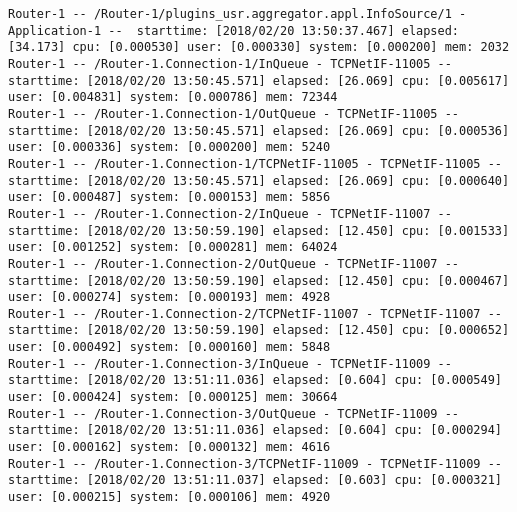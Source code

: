 \begin{lstlisting}[language=config]
Router-1 -- /Router-1/plugins_usr.aggregator.appl.InfoSource/1 - Application-1 --  starttime: [2018/02/20 13:50:37.467] elapsed: [34.173] cpu: [0.000530] user: [0.000330] system: [0.000200] mem: 2032
Router-1 -- /Router-1.Connection-1/InQueue - TCPNetIF-11005 --  starttime: [2018/02/20 13:50:45.571] elapsed: [26.069] cpu: [0.005617] user: [0.004831] system: [0.000786] mem: 72344
Router-1 -- /Router-1.Connection-1/OutQueue - TCPNetIF-11005 --  starttime: [2018/02/20 13:50:45.571] elapsed: [26.069] cpu: [0.000536] user: [0.000336] system: [0.000200] mem: 5240
Router-1 -- /Router-1.Connection-1/TCPNetIF-11005 - TCPNetIF-11005 --  starttime: [2018/02/20 13:50:45.571] elapsed: [26.069] cpu: [0.000640] user: [0.000487] system: [0.000153] mem: 5856
Router-1 -- /Router-1.Connection-2/InQueue - TCPNetIF-11007 --  starttime: [2018/02/20 13:50:59.190] elapsed: [12.450] cpu: [0.001533] user: [0.001252] system: [0.000281] mem: 64024
Router-1 -- /Router-1.Connection-2/OutQueue - TCPNetIF-11007 --  starttime: [2018/02/20 13:50:59.190] elapsed: [12.450] cpu: [0.000467] user: [0.000274] system: [0.000193] mem: 4928
Router-1 -- /Router-1.Connection-2/TCPNetIF-11007 - TCPNetIF-11007 --  starttime: [2018/02/20 13:50:59.190] elapsed: [12.450] cpu: [0.000652] user: [0.000492] system: [0.000160] mem: 5848
Router-1 -- /Router-1.Connection-3/InQueue - TCPNetIF-11009 --  starttime: [2018/02/20 13:51:11.036] elapsed: [0.604] cpu: [0.000549] user: [0.000424] system: [0.000125] mem: 30664
Router-1 -- /Router-1.Connection-3/OutQueue - TCPNetIF-11009 --  starttime: [2018/02/20 13:51:11.036] elapsed: [0.604] cpu: [0.000294] user: [0.000162] system: [0.000132] mem: 4616
Router-1 -- /Router-1.Connection-3/TCPNetIF-11009 - TCPNetIF-11009 --  starttime: [2018/02/20 13:51:11.037] elapsed: [0.603] cpu: [0.000321] user: [0.000215] system: [0.000106] mem: 4920
\end{lstlisting}


